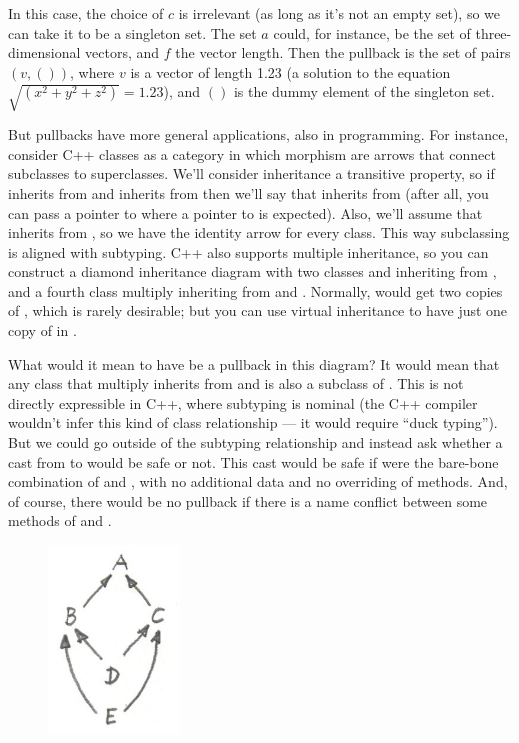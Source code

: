 
In this case, the choice of $c$ is irrelevant (as long as it's
not an empty set), so we can take it to be a singleton set. The set
$a$ could, for instance, be the set of three-dimensional vectors,
and $f$ the vector length. Then the pullback is the set of pairs
$(v, ())$, where $v$ is a vector of length 1.23 (a
solution to the equation $\sqrt{(x^{2}+y^{2}+z^{2})} = 1.23$), and
$()$ is the dummy element of the singleton set.

But pullbacks have more general applications, also in programming. For
instance, consider C++ classes as a category in which morphism are
arrows that connect subclasses to superclasses. We'll consider
inheritance a transitive property, so if  inherits from  and 
inherits from  then we'll say that  inherits from  (after all, you
can pass a pointer to  where a pointer to  is expected). Also, we'll
assume that  inherits from , so we have the identity arrow for every
class. This way subclassing is aligned with subtyping. C++ also supports
multiple inheritance, so you can construct a diamond inheritance diagram
with two classes  and  inheriting from , and a fourth class 
multiply inheriting from  and . Normally,  would get two copies of ,
which is rarely desirable; but you can use virtual inheritance to have
just one copy of  in .

What would it mean to have  be a pullback in this diagram? It would
mean that any class  that multiply inherits from  and  is also a
subclass of . This is not directly expressible in C++, where subtyping
is nominal (the C++ compiler wouldn't infer this kind of class
relationship --- it would require ``duck typing''). But we could go
outside of the subtyping relationship and instead ask whether a cast
from  to  would be safe or not. This cast would be safe if  were the
bare-bone combination of  and , with no additional data and no
overriding of methods. And, of course, there would be no pullback if
there is a name conflict between some methods of  and .

\begin{figure}[H]
\centering
\includegraphics[width=35mm]{images/classes.jpg}
\end{figure}

